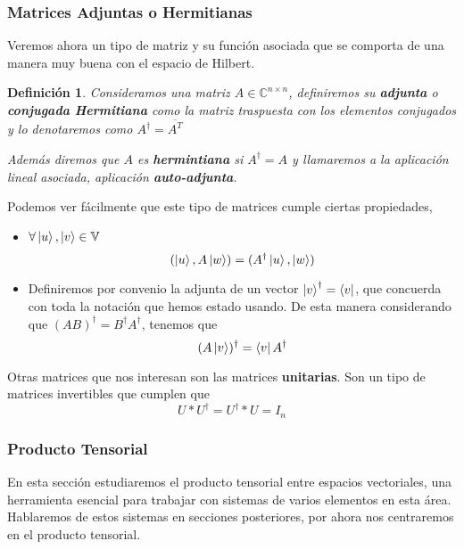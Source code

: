 \documentclass[a4paper]{article}
\newtheorem{deff}{Definición}[section]
\numberwithin{equation}{section}
\begin{document}
\subsubsection{Matrices Adjuntas o Hermitianas}
Veremos ahora un tipo de matriz y su función asociada que se comporta de una manera muy buena con el espacio de Hilbert.

\begin{deff}Consideramos una matriz $A \in \mathbb{C}^{n\times n}$, definiremos su \textbf{adjunta} o \textbf{conjugada Hermitiana} como la matriz traspuesta con los elementos conjugados y lo denotaremos como $A^\dagger = \overline{A^T}$

Además diremos que $A$ es \textbf{hermintiana} si $A^\dagger = A$ y llamaremos a la aplicación lineal asociada, aplicación \textbf{auto-adjunta}.

\end{deff}

Podemos ver fácilmente que este tipo de matrices cumple ciertas propiedades,
\begin{itemize}

\item $\forall \ket{u}, \ket{v} \in \mathbb{V}$
\begin{equation}
(\ket{u}, A \ket{w}) = (A^\dagger \ket{u},\ket{w})
\end{equation}

\item Definiremos por convenio la adjunta de un vector $\ket{v}^\dagger = \bra{v}$, que concuerda con toda la notación que hemos estado usando. De esta manera considerando que $(AB)^\dagger = B^\dagger A^\dagger$, tenemos que
\begin{equation}
(A\ket{v})^\dagger = \bra{v}A^\dagger
\end{equation}
\end{itemize}

Otras matrices que nos interesan son las matrices \textbf{unitarias}. Son un tipo de matrices invertibles que cumplen que
\begin{equation}
U * U^\dagger = U^\dagger * U = I_n
\end{equation}

\subsubsection{Producto Tensorial}

En esta sección estudiaremos el producto tensorial entre espacios vectoriales, una herramienta esencial para trabajar con sistemas de varios elementos en esta área. Hablaremos de estos sistemas en secciones posteriores, por ahora nos centraremos en el producto tensorial.
\end{document}
